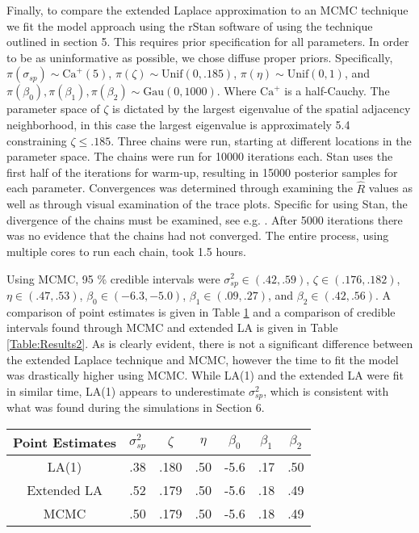 \documentclass[11pt]{isuthesis}
\begin{document}
	Finally, to compare the extended Laplace approximation to an MCMC technique we fit the model approach using the rStan software of \cite{gelman2015stan} using the technique outlined in section 5.  This requires prior specification for all parameters.  In order to be as uninformative as possible, we chose diffuse proper priors.  Specifically, $\pi(\sigma_{sp})\sim \text{Ca}^{+}(5)$, $\pi(\zeta) \sim \text{Unif}(0,.185)$, $\pi(\eta)\sim \text{Unif}(0,1)$, and $\pi(\beta_0),\pi(\beta_1),\pi(\beta_2) \sim \text{Gau} (0,1000)$.  Where $\text{Ca}^+$ is a half-Cauchy.  The parameter space of $\zeta$ is dictated by the largest eigenvalue of the spatial adjacency neighborhood, in this case the largest eigenvalue is approximately 5.4 constraining $\zeta \leq .185$.  Three chains were run, starting at different locations in the parameter space.  The chains were run for 10000 iterations each.  Stan uses the first half of the iterations for warm-up, resulting in 15000 posterior samples for each parameter.  Convergences was determined through examining the $\hat{R}$ values as well as through visual examination of the trace plots.  Specific for using Stan, the divergence of the chains must be examined, see e.g. \cite{betancort}.  After 5000 iterations there was no evidence that the chains had not converged.  The entire process, using multiple cores to run each chain, took 1.5 hours.  
	
	Using MCMC, 95 \% credible intervals were $\sigma_{sp}^2 \in (.42,.59)$, $\zeta \in (.176,.182)$, $\eta \in (.47,.53)$, $\beta_0 \in (-6.3,-5.0)$, $\beta_1 \in (.09,.27)$, and $\beta_2 \in (.42,.56)$.  A comparison of point estimates is given in Table \ref{Table:Results} and a comparison of credible intervals found through MCMC and extended LA is given in Table \ref{Table:Results2}.  As is clearly evident, there is not a significant difference between the extended Laplace technique and MCMC, however the time to fit the model was drastically higher using MCMC.  While LA(1) and the extended LA were fit in similar time, LA(1) appears to underestimate $\sigma_{sp}^2$, which is consistent with what was found during the simulations in Section 6.
	
	\begin{table}[h]
		\begin{center}
			\begin{tabular}{ |c|c|c|c|c|c|c| } 
				\hline
				Point Estimates & $\sigma_{sp}^2$ & $\zeta$ & $\eta$ & $\beta_0$ & $\beta_1$ & $\beta_2$\\
				\hline
				LA(1) & .38 & .180 &.50& -5.6 & .17 & .50 \\ 
				Extended LA & .52 & .179 &.50& -5.6 & .18 & .49\\
				MCMC & .50 & .179 & .50 & -5.6 & .18 & .49\\
				\hline
			\end{tabular}
		\end{center}
		\label{Table:Results}
	\end{table}
	
\end{document}

